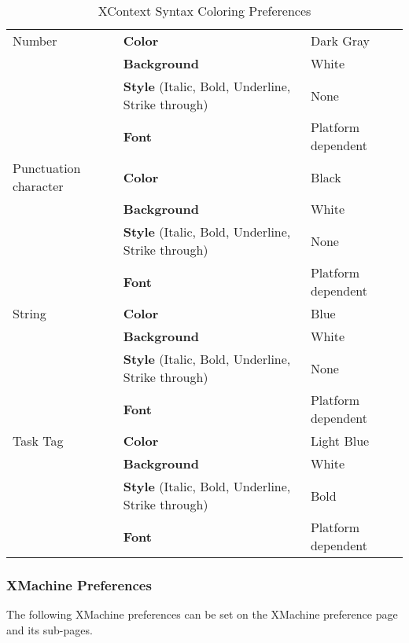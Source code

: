 \begin{EventBNoShortInline}
\begin{table}[!htbp]
\begin{tabular}{|p{}|p{}|p{}|}
      \hline
      Number & \textbf{Color} & Dark Gray \\
                                           & \textbf{Background} & White \\
                                           & \textbf{Style} (Italic, Bold, Underline, Strike through) & None \\
                                           & \textbf{Font} & Platform dependent \\
      \hline
      Punctuation character & \textbf{Color} & Black \\
                                           & \textbf{Background} & White \\
                                           & \textbf{Style} (Italic, Bold, Underline, Strike through) & None \\
                                           & \textbf{Font} & Platform dependent \\
      \hline
      String & \textbf{Color} & Blue \\
                                           & \textbf{Background} & White \\
                                           & \textbf{Style} (Italic, Bold, Underline, Strike through) & None \\
                                           & \textbf{Font} & Platform dependent \\
      \hline
      Task Tag & \textbf{Color} & Light Blue \\
                                           & \textbf{Background} & White \\
                                           & \textbf{Style} (Italic, Bold, Underline, Strike through) & Bold \\
                                           & \textbf{Font} & Platform dependent \\
      \hline
    \end{tabular}
    \caption{XContext Syntax Coloring Preferences}
    \label{tab:xcontext-syntax-coloring-preference}
  \end{table}
\end{EventBNoShortInline}

\subsubsection{XMachine Preferences}
\label{sec:xmachine-preferences}
The following XMachine preferences can be set on the  XMachine preference page and its sub-pages.

